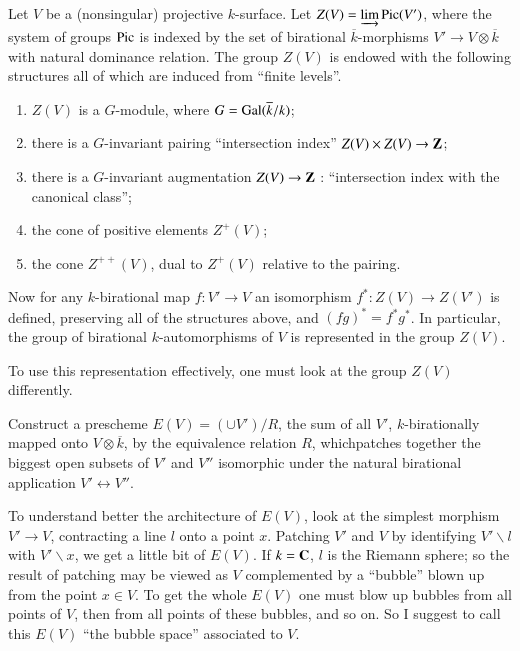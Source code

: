 Let $V$ be a (nonsingular) projective $k$-surface. Let $Z(V)=\varinjlim\break \Pic (V')$, where the system of groups $\operatorname{\mathrm{Pic}}$ is indexed by the set of birational $\overline{k}$-morphisms $V'\to V\otimes \overline{k}$ with natural dominance relation. The group $Z(V)$ is endowed with the following structures all of which are induced from ``finite levels''.
\begin{enumerate}
\item $Z(V)$ is a $G$-module, where $G=\operatorname{\mathrm{Gal}} (\overline{k}/k)$;

\item there is a $G$-invariant pairing ``intersection index'' $Z(V)\times Z(V)\to \mathbf{Z}$;

\item there is a $G$-invariant augmentation $Z(V)\to \mathbf{Z}$ : ``intersection index with the canonical class'';

\item the cone of positive elements $Z^{+}(V)$;

\item the cone $Z^{++}(V)$, dual to $Z^{+}(V)$ relative to the pairing.
\end{enumerate}

Now for any $k$-birational map $f:V'\to V$ an isomorphism $f^{*}:Z(V)\to Z(V')$ is defined, preserving all of the structures above, and $(fg)^{*}=f^{*}g^{*}$. In particular, the group of birational $k$-automorphisms of $V$ is represented in the group $Z(V)$.

To use this representation effectively, one must look at the group $Z(V)$ differently.

Construct a prescheme $E(V)=(\cup V')/R$, the sum of all $V'$, $k$-birationally mapped onto $V\otimes\overline{k}$, by the equivalence relation $R$, which\pageoriginale patches together the biggest open subsets of $V'$ and $V''$ isomorphic under the natural birational application $V'\longleftrightarrow V''$.

To understand better the architecture of $E(V)$, look at the simplest morphism $V'\to V$, contracting a line $l$ onto a point $x$. Patching $V'$ and $V$ by identifying $V'\backslash l$ with $V'\backslash x$, we get a little bit of $E(V)$. If $k=\mathbf{C}$, $l$ is the Riemann sphere; so the result of patching may be viewed as $V$ complemented by a ``bubble'' blown up from the point $x\in V$. To get the whole $E(V)$ one must blow up bubbles from all points of $V$, then from all points of these bubbles, and so on. So I suggest to call this $E(V)$ ``the bubble space'' associated to $V$.

